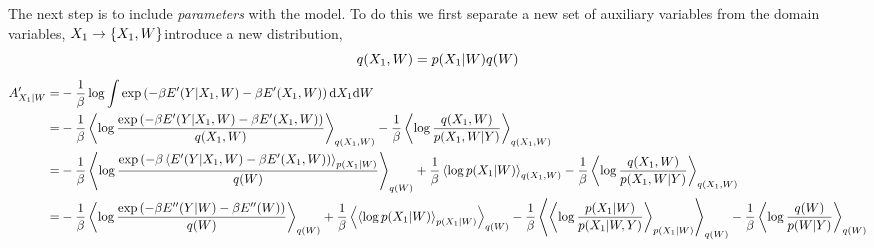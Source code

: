 \documentclass[]{article}
\begin{document}
The next step is to include \emph{parameters} with the model. To do this
we first separate a new set of auxiliary variables from the domain
variables,
\(X_1 \rightarrow \{X_1, W\}\)introduce
a new distribution, \[
q(X_1, W) = p(X_1 | W)q(W)
\] 
\begin{align*}
A^\prime_{X_1|W} = & -\frac{1}{\beta} \log \int \exp\left(-\beta E^\prime(Y |X_1, W) - \beta E^\prime(X_1, W)\right) \text{d}X_1 \text{d}W\\
= & -\frac{1}{\beta} \left\langle \log\frac{\exp\left(-\beta E^\prime(Y |X_1, W) - \beta E^\prime(X_1, W)\right)}{q(X_1, W)} \right\rangle_{q(X_1, W)} - \frac{1}{\beta} \left\langle \log\frac{q(X_1 , W)}{p(X_1, W | Y)} \right\rangle_{q(X_1, W)} \\
= & -\frac{1}{\beta} \left\langle \log\frac{\exp\left(-\beta \left\langle E^\prime(Y |X_1, W) - \beta E^\prime(X_1, W)\right) \right\rangle_{p(X_1 | W)}}{q(W)} \right\rangle_{q(W)} + \frac{1}{\beta} \left\langle \log p(X_1 | W) \right\rangle_{q(X_1, W)} - \frac{1}{\beta} \left\langle \log\frac{q(X_1 , W)}{p(X_1, W | Y)} \right\rangle_{q(X_1, W)} \\
= & -\frac{1}{\beta} \left\langle \log\frac{\exp\left(-\beta E^{\prime\prime}(Y |W) - \beta E^{\prime\prime}(W)\right)}{q(W)} \right\rangle_{q(W)} + \frac{1}{\beta} \left\langle \left\langle \log p(X_1 | W) \right\rangle_{p(X_1 | W)} \right\rangle_{q(W)} - \frac{1}{\beta} \left\langle \left\langle \log\frac{p(X_1 | W)}{p(X_1| W , Y)} \right\rangle_{p(X_1 | W)} \right\rangle_{q(W)} - \frac{1}{\beta}\left\langle \log\frac{q(W)}{p(W|Y)} \right\rangle_{q(W)}
\end{align*}
\end{document}
